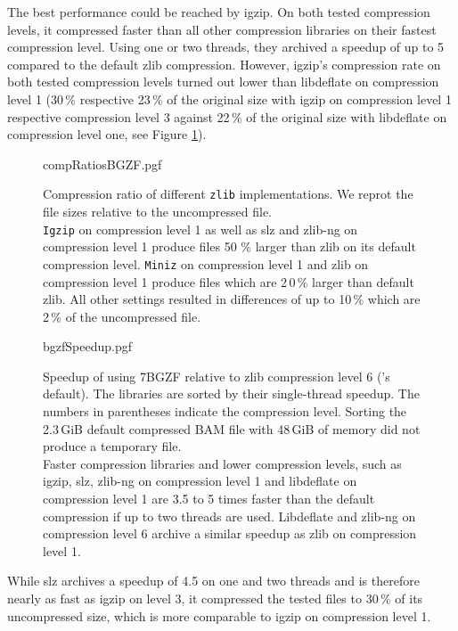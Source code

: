 The best performance could be reached by igzip. On both tested compression levels, it compressed faster than all other compression libraries on their fastest compression level. Using one or two threads, they archived a speedup of up to 5 compared to the default zlib compression. However, igzip's compression rate on both tested compression levels turned out lower than libdeflate on compression level 1 (30\,\% respective 23\,\% of the original size with igzip on compression level 1 respective compression level 3 against 22\,\% of the original size with libdeflate on compression level one, see Figure \ref{fig:bgzfComps}). \\
\begin{figure}[!htb]
        {compRatiosBGZF.pgf}
    \caption{Compression ratio of different \texttt{zlib} implementations. We reprot the file sizes relative to the uncompressed file. \\
    \texttt{Igzip} on compression level 1 as well as slz and zlib-ng on compression level 1 produce files 50\,\,\% larger than zlib on its default compression level. \texttt{Miniz} on compression level 1 and zlib on compression level 1 produce files which are 2\,0\,\% larger than default zlib. All other settings resulted in differences of up to 10\,\% which are 2\,\% of the uncompressed file.}
    \label{fig:bgzfComps}
\end{figure}
\begin{figure}[!htb]
        {bgzfSpeedup.pgf}
    \caption{Speedup of \sort using 7BGZF relative to zlib compression level 6 (\sort's default). The libraries are sorted by their single-thread speedup. The numbers in parentheses indicate the compression level. Sorting the 2.3\,GiB default compressed BAM file with 48\,GiB of memory did not produce a temporary file. \\
    Faster compression libraries and lower compression levels, such as igzip, slz, zlib-ng on compression level 1 and libdeflate on compression level 1 are 3.5 to 5 times faster than the default compression if up to two threads are used. Libdeflate and zlib-ng on compression level 6 archive a similar speedup as zlib on compression level 1.}
    \label{fig:bgzfspeed}
\end{figure}
While slz archives a speedup of 4.5 on one and two threads  and is therefore nearly as fast as igzip on level 3, it compressed the tested files to 30\,\% of its uncompressed size, which is more comparable to igzip on compression level 1. \\
